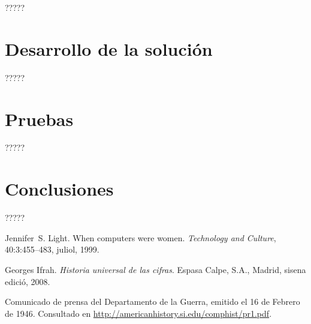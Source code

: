 \documentclass[11pt,spanish,listoffigures]{tfgetsinf}
\begin{document}
?????


\chapter{Desarrollo de la solución}

?????


\chapter{Pruebas}

?????


\chapter{Conclusiones}

?????


\begin{thebibliography}{10}

   Jennifer~S. Light.
   \newblock When computers were women.
   \newblock \textit{Technology and Culture}, 40:3:455--483, juliol, 1999.

   Georges Ifrah.
   \newblock \textit{Historia universal de las cifras}.
   \newblock Espasa Calpe, S.A., Madrid, sisena edició, 2008.

   Comunicado de prensa del Departamento de la Guerra, 
   emitido el 16 de Febrero de 1946. 
   \newblock Consultado en 
   \url{http://americanhistory.si.edu/comphist/pr1.pdf}.

\end{thebibliography}
\cleardoublepage
\end{document}
